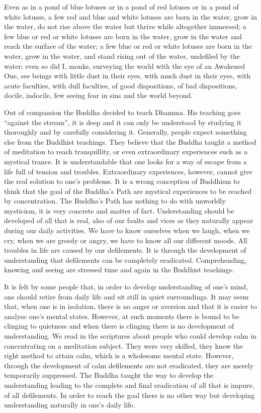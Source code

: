 \documentclass{book}
\begin{document}
Even as in a pond of blue lotuses or in a pond of red lotuses or in a
pond of white lotuses, a few red and blue and white lotuses are born in
the water, grow in the water, do not rise above the water but thrive
while altogether immersed; a few blue or red or white lotuses are born
in the water, grow in the water and reach the surface of the water; a
few blue or red or white lotuses are born in the water, grow in the
water, and stand rising out of the water, undefiled by the water; even
so did I, monks, surveying the world with the eye of an Awakened One,
see beings with little dust in their eyes, with much dust in their eyes,
with acute faculties, with dull faculties, of good dispositions, of bad
dispositions, docile, indocile, few seeing fear in sins and the world
beyond.

Out of compassion the Buddha decided to teach Dhamma. His teaching goes
``against the stream'', it is deep and it can only be understood by
studying it thoroughly and by carefully considering it. Generally,
people expect some­thing else from the Buddhist teachings. They believe
that the Buddha taught a method of meditation to reach tranquillity, or
even extraordinary experiences such as a mystical trance. It is
understandable that one looks for a way of escape from a life full of
tension and troubles. Extraordinary experiences, however, cannot give
the real solution to one's problems. It is a wrong conception of
Buddhism to think that the goal of the Buddha's Path are mystical
experiences to be reached by concentration. The Buddha's Path has
nothing to do with unworldly mysticism, it is very concrete and matter
of fact. Understanding should be developed of all that is real, also of
our faults and vices as they naturally appear during our daily
activities. We have to know ourselves when we laugh, when we cry, when
we are greedy or angry, we have to know all our different moods. All
troubles in life are caused by our defilements. It is through the
development of understanding that defilements can be completely
erad­icated. Comprehending, knowing and seeing are stressed time and
again in the Buddhist teachings.

It is felt by some people that, in order to develop understanding of
one's mind, one should retire from daily life and sit still in quiet
surroundings. It may seem that, when one is in isolation, there is no
anger or aversion and that it is easier to analyse one's mental states.
However, at such moments there is bound to be clinging to quietness and
when there is clinging there is no development of understanding. We read
in the scriptures about people who could develop calm in concentrating
on a meditation subject. They were very skilled, they knew the right
method to attain calm, which is a wholesome mental state. However,
through the development of calm defilements are not eradicated, they are
merely temporarily suppressed. The Buddha taught the way to develop the
understanding leading to the complete and final eradication of all that
is impure, of all defilements. In order to reach the goal there is no
other way but developing understanding naturally in one's daily life.
\end{document}
